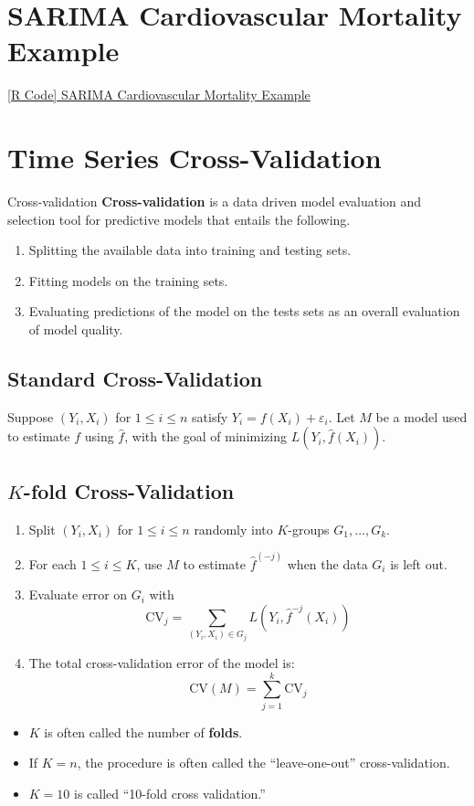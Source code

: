 \section{SARIMA Cardiovascular Mortality Example}
\href{https://github.com/Hextical/university-notes/blob/master/year-3/semester-2/STAT%20443/code/6.2%20-%20SARIMA%20Cmort%20Example.R}{[R Code] SARIMA Cardiovascular Mortality Example}
\section{Time Series Cross-Validation}
\begin{Definition}{Cross-validation}{}
      \textbf{Cross-validation} is a data driven model evaluation
      and selection tool for predictive models that entails the following.
      \begin{enumerate}[(1)]
            \item Splitting the available data into training and testing sets.
            \item Fitting models on the training sets.
            \item Evaluating predictions of the model on the tests sets as an overall
                  evaluation of model quality.
      \end{enumerate}
\end{Definition}
\subsection*{Standard Cross-Validation}
Suppose $ (Y_i,X_i) $ for $ 1\le i\le n $ satisfy $ Y_i=f(X_i)+\varepsilon_i $.
Let $ M $ be a model used to estimate $ f $ using $ \hat{f} $,
with the goal of minimizing $ L(Y_i,\hat{f}(X_i)) $.
\subsection*{$ K $-fold Cross-Validation}
\begin{enumerate}[(1)]
      \item Split $ (Y_i,X_i) $ for $ 1\le i\le n $ randomly into $ K $-groups
            $ G_1,\ldots,G_k $.
      \item For each $ 1\le i\le K $, use $ M $ to estimate $ \hat{f}^{(-j)} $
            when the data $ G_i $ is left out.
      \item Evaluate error on $ G_i $ with
            \[ \text{CV}_j=\sum_{(Y_i,X_i)\in G_j}L(Y_i,\hat{f}^{-j}(X_i))  \]
      \item The total cross-validation error of the model is:
            \[ \text{CV}(M)=\sum_{j=1}^{k} \text{CV}_j \]
\end{enumerate}
\begin{Remark}{}{}
      \begin{itemize}
            \item $ K $ is often called the number of \textbf{folds}.
            \item If $ K=n $, the procedure is often called the ``leave-one-out''
                  cross-validation.
            \item $ K=10 $ is called ``10-fold cross validation.''
      \end{itemize}
\end{Remark}
